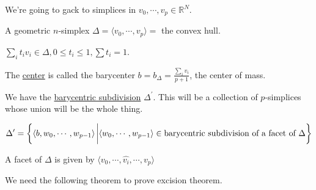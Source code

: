 \documentclass{article}
\theoremstyle{definition}
\begin{document}
    We're going to gack to simplices in \(v_0, \cdots , v_p \in \mathbb{R}^N\).

    A geometric \(n\)-simplex \(\Delta = \langle v_0, \cdots , v_p \rangle =\) the convex hull.

    \(\sum_{i} t_i v_i \in \Delta, 0 \leq t_i \leq 1, \sum t_i = 1\).

    The \underline{center} is called the barycenter \(b = b_\Delta = \frac{\sum_{i} v_i}{p+1}\), the center of mass.

    We have the \underline{barycentric subdivision} \(\Delta^{\prime}\). This will be a collection of \(p\)-simplices whose union will be the whole thing.

    \[
        \Delta^{\prime} = \left\{ \langle b, w_0, \cdots, w_{p-1} \rangle \eval \langle w_0, \cdots , w_{p-1} \rangle \in \text{barycentric subdivision of  a facet of \(\Delta\)}  \right\} 
    \]

    A facet of \(\Delta\) is given by \(\langle v_0, \cdots , \widehat{v_i}, \cdots , v_p \rangle \) 


    We need the following theorem to prove excision theorem.
\end{document}
